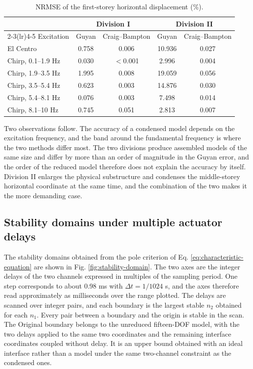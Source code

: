 \documentclass[a4paper,fleqn,review,12pt]{cas-sc}
\numberwithin{equation}{section}
\begin{document}
\begin{table}[htbp]
	\centering
	\caption{NRMSE of the first-storey horizontal displacement (\%).}
	\label{tab:nrmse}
	\begin{tabular}{lcccc}
		\toprule
		& \multicolumn{2}{c}{Division I} & \multicolumn{2}{c}{Division II}\\
		\cmidrule(lr){2-3}\cmidrule(lr){4-5}
		Excitation & Guyan & Craig--Bampton & Guyan & Craig--Bampton\\
		\midrule
		El Centro           & 0.758 & 0.006    & 10.936 & 0.027\\
		\midrule
		Chirp, 0.1--1.9 Hz  & 0.030 & $<$0.001 & 2.996  & 0.004\\
		Chirp, 1.9--3.5 Hz  & 1.995 & 0.008    & 19.059 & 0.056\\
		Chirp, 3.5--5.4 Hz  & 0.623 & 0.003    & 14.876 & 0.030\\
		Chirp, 5.4--8.1 Hz  & 0.076 & 0.003    & 7.498  & 0.014\\
		Chirp, 8.1--10 Hz   & 0.745 & 0.051    & 2.813  & 0.007\\
		\bottomrule
	\end{tabular}
\end{table}

Two observations follow. The accuracy of a condensed model depends on the excitation frequency, and the band around the fundamental frequency is where the two methods differ most. The two divisions produce assembled models of the same size and differ by more than an order of magnitude in the Guyan error, and the order of the reduced model therefore does not explain the accuracy by itself. Division II enlarges the physical substructure and condenses the middle-storey horizontal coordinate at the same time, and the combination of the two makes it the more demanding case.

\subsection{Stability domains under multiple actuator delays}
\label{sec:stability-domains}

The stability domains obtained from the pole criterion of Eq. \eqref{eq:characteristic-equation} are shown in Fig. \ref{fig:stability-domain}. The two axes are the integer delays of the two channels expressed in multiples of the sampling period. One step corresponds to about 0.98 ms with \(\Delta t=1/1024\) s, and the axes therefore read approximately as milliseconds over the range plotted. The delays are scanned over integer pairs, and each boundary is the largest stable \(n_{2}\) obtained for each \(n_{1}\). Every pair between a boundary and the origin is stable in the scan. The Original boundary belongs to the unreduced fifteen-DOF model, with the two delays applied to the same two coordinates and the remaining interface coordinates coupled without delay. It is an upper bound obtained with an ideal interface rather than a model under the same two-channel constraint as the condensed ones.
\end{document}
